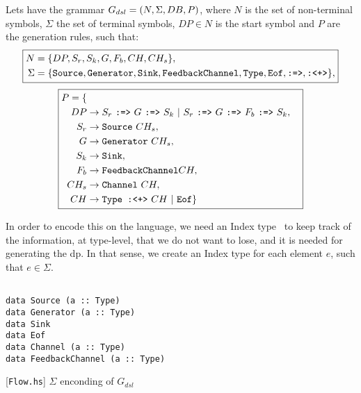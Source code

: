 \begin{definition}
Lets have the grammar $G_{dsl} = (N, \Sigma, DB, P)$, where $N$ is the set of non-terminal symbols, $\Sigma$ the set of terminal symbols,
$DP \in N$ is the start symbol and $P$ are the generation rules, such that:
\begin{equation*}
    \boxed{
      \begin{aligned}
    N &= \{DP,S_r,S_k,G,F_b,CH,CH_s\},\\
    \Sigma &= \{\text{\texttt{Source}},\text{\texttt{Generator}},\text{\texttt{Sink}},\text{\texttt{FeedbackChannel}},\text{\texttt{Type}},\text{\texttt{Eof}},\text{\texttt{:=>}},\text{\texttt{:<+>}}\},
    \end{aligned}
    }
\end{equation*}
\begin{equation*}
  \boxed{
    \begin{aligned}
  P = \{\\
  DP  &\rightarrow S_r\ \text{\texttt{:=>}}\ G\ \text{\texttt{:=>}}\ S_k\ |\ S_r\ \text{\texttt{:=>}}\ G\ \text{\texttt{:=>}}\ F_b\ \text{\texttt{:=>}}\ S_k,\\
  S_r &\rightarrow \text{\texttt{Source}}\ CH_s,\\
  G   &\rightarrow \text{\texttt{Generator}}\ CH_s,\\
  S_k &\rightarrow \text{\texttt{Sink}},\\
  F_b &\rightarrow \text{\texttt{FeedbackChannel}} CH,\\
  CH_s &\rightarrow \text{\texttt{Channel}}\ CH,\\
  CH &\rightarrow \text{\texttt{Type :<+>}}\ CH\ |\ \text{\texttt{Eof}}\}
\end{aligned}
}
\end{equation*}
\end{definition}

In order to encode this on the language, we need an Index type~\cite{type-index} to keep track of the information, at type-level, that we do not want to lose, and it is needed for generating the \acrshort{dp}. 
In that sense, we create an Index type for each element $e$, such that $e \in \Sigma$.

\begin{listing}[H]
  \begin{verbatim}

data Source (a :: Type)
data Generator (a :: Type)
data Sink
data Eof
data Channel (a :: Type)
data FeedbackChannel (a :: Type)

  \end{verbatim}
  \caption{[\texttt{Flow.hs}] $\Sigma$ enconding of $G_{dsl}$}
  \label{src:dpfh:1}
\end{listing}
  
